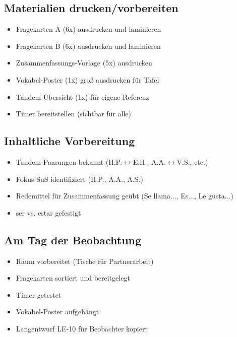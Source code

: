 \documentclass[11pt, a4paper]{article}
\begin{document}
\subsection*{Materialien drucken/vorbereiten}

\begin{itemize}[leftmargin=2em]
    \item[$\square$] Fragekarten A (6x) ausdrucken und laminieren
    \item[$\square$] Fragekarten B (6x) ausdrucken und laminieren
    \item[$\square$] Zusammenfassungs-Vorlage (5x) ausdrucken
    \item[$\square$] Vokabel-Poster (1x) groß ausdrucken für Tafel
    \item[$\square$] Tandem-Übersicht (1x) für eigene Referenz
    \item[$\square$] Timer bereitstellen (sichtbar für alle)
\end{itemize}

\subsection*{Inhaltliche Vorbereitung}

\begin{itemize}[leftmargin=2em]
    \item[$\square$] Tandem-Paarungen bekannt (H.P.$\leftrightarrow$E.H., A.A.$\leftrightarrow$V.S., etc.)
    \item[$\square$] Fokus-SuS identifiziert (H.P., A.A., A.S.)
    \item[$\square$] Redemittel für Zusammenfassung geübt (Se llama..., Es..., Le gusta...)
    \item[$\square$] ser vs. estar gefestigt
\end{itemize}

\subsection*{Am Tag der Beobachtung}

\begin{itemize}[leftmargin=2em]
    \item[$\square$] Raum vorbereitet (Tische für Partnerarbeit)
    \item[$\square$] Fragekarten sortiert und bereitgelegt
    \item[$\square$] Timer getestet
    \item[$\square$] Vokabel-Poster aufgehängt
    \item[$\square$] Langentwurf LE-10 für Beobachter kopiert
\end{itemize}
\end{document}

